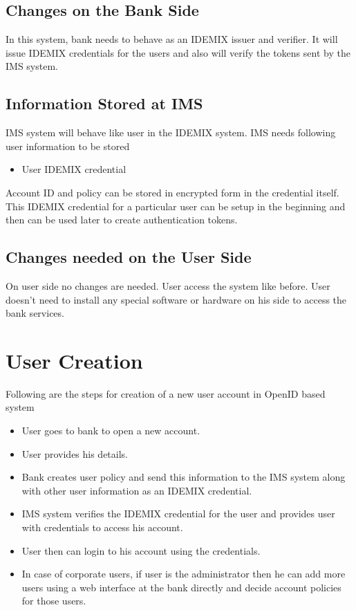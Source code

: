 \subsection{Changes on the Bank Side}
In this system, bank needs to behave as an IDEMIX issuer and verifier. It will issue IDEMIX credentials for the users and also will verify the tokens sent by the IMS system. 
\subsection{Information Stored at IMS}
IMS system will behave like user in the IDEMIX system. IMS needs following user information to be stored
\begin{itemize}
	\item User IDEMIX credential
\end{itemize}
Account ID and policy can be stored in encrypted form in the credential itself. This IDEMIX credential for a particular user can be setup in the beginning and then can be used later to create authentication tokens.
\subsection{Changes needed on the User Side}
On user side no changes are needed. User access the system like before. User doesn't need to install any special software or hardware on his side to access the bank services. 
\section{User Creation}
Following are the steps for creation of a new user account in OpenID based system
\begin{itemize}
	\item User goes to bank to open a new account.
	\item User provides his details.
	\item Bank creates user policy and send this information to the IMS system along with other user information as an IDEMIX credential.
	\item IMS system verifies the IDEMIX credential for the user and provides user with credentials to access his account.
	\item User then can login to his account using the credentials.
	\item In case of corporate users, if user is the administrator then he can add more users using a web interface at the bank directly and decide account policies for those users.
\end{itemize}
